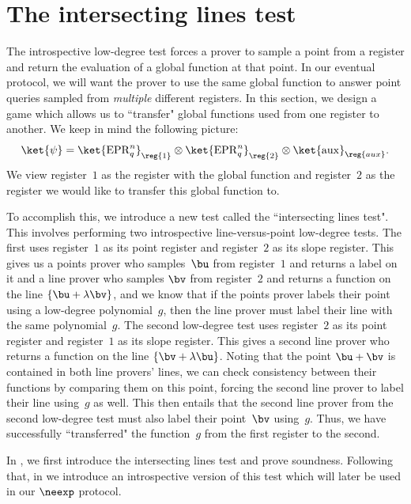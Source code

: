 \section{The intersecting lines test}\label{sec:intersection}

The introspective low-degree test forces a prover to sample a point from a register and return the evaluation of a global function at that point.
In our eventual protocol, we will want the prover to use the same global function to answer point queries sampled from \emph{multiple} different registers.
In this section, we design a game which allows us to ``transfer" global functions used from one register  to another.
We keep in mind the following picture:
\begin{equation*}
\ket{\psi} = \ket{\mathrm{EPR}^n_q}_{\reg{1}} \otimes \ket{\mathrm{EPR}^n_q}_{\reg{2}} \otimes \ket{\mathrm{aux}}_{\reg{aux}}.
\end{equation*}
We view register~$1$ as the register with the global function
and register~$2$ as the register we would like to transfer this global function to.

To accomplish this, we introduce a new test called the ``intersecting lines test".
This involves performing two introspective line-versus-point low-degree tests.
The first uses register~$1$ as its point register and register~$2$ as its slope register.
This gives us a points prover who samples~$\bu$ from register~$1$ and returns a label on it
and a line prover who samples $\bv$ from register~$2$ and returns a function on the line $\{\bu + \lambda \bv\}$,
and we know that if the points prover labels their point using a low-degree polynomial~$g$, 
then the line prover must label their line with the same polynomial~$g$.
The second low-degree test uses register~$2$ as its point register and register~$1$ as its slope register.
This gives a second line prover who returns a function on the line $\{\bv + \lambda \bu\}$.
Noting that the point $\bu + \bv$ is contained in both line provers' lines,
we can check consistency between their functions
by comparing them on this point,
forcing the second line prover to label their line using~$g$ as well.
This then entails that the second line prover from the second low-degree test must also 
label their point~$\bv$ using~$g$.
Thus, we have successfully ``transferred" the function~$g$ from the first register to the second.

In , we first introduce the intersecting lines test and prove soundness.
Following that, in 
we introduce an introspective version of this test which will later be used in our $\neexp$ protocol.

